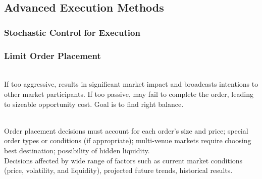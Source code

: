 
\subsection{Advanced Execution Methods}

\subsubsection{Stochastic Control for Execution}

\subsubsection{Limit Order Placement}

\begin{remark} \\
If too aggressive, results in significant market impact and broadcasts intentions to other market participants. If too passive, may fail to complete the order, leading to sizeable opportunity cost. Goal is to find right balance.
\end{remark}

\begin{remark} \\
Order placement decisions must account for each order's size and price; special order types or conditions (if appropriate); multi-venue markets require choosing best destination; possibility of hidden liquidity.\\
Decisions affected by wide range of factors such as current market conditions (price, volatility, and liquidity), projected future trends, historical results.
\end{remark}

